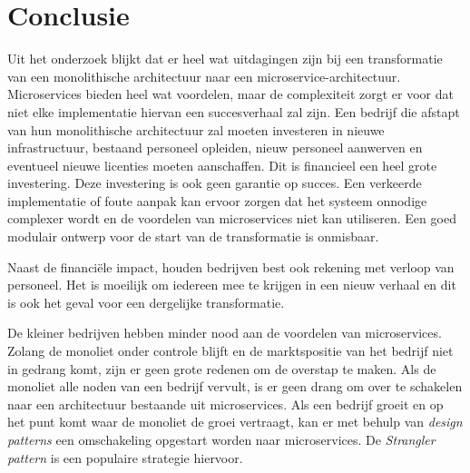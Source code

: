 
\chapter{Conclusie}
\label{ch:conclusie}


Uit het onderzoek blijkt dat er heel wat uitdagingen zijn bij een transformatie van een monolithische architectuur naar een microservice-architectuur. Microservices bieden heel wat voordelen, maar de complexiteit zorgt er voor dat niet elke implementatie hiervan een succesverhaal zal zijn. Een bedrijf die afstapt van hun monolithische architectuur zal moeten investeren in nieuwe infrastructuur, bestaand personeel opleiden, nieuw personeel aanwerven en eventueel nieuwe licenties moeten aanschaffen. Dit is financieel een heel grote investering. Deze investering is ook geen garantie op succes. Een verkeerde implementatie of foute aanpak kan ervoor zorgen dat het systeem onnodige complexer wordt en de voordelen van microservices niet kan utiliseren. Een goed modulair ontwerp voor de start van de transformatie is onmisbaar. 

Naast de financiële impact, houden bedrijven best ook rekening met verloop van personeel. Het is moeilijk om iedereen mee te krijgen in een nieuw verhaal en dit is ook het geval voor een dergelijke transformatie.

De kleiner bedrijven hebben minder nood aan de voordelen van microservices. Zolang de monoliet onder controle blijft en de marktspositie van het bedrijf niet in gedrang komt, zijn er geen grote redenen om de overstap te maken. Als de monoliet alle noden van een bedrijf vervult, is er geen drang om over te schakelen naar een architectuur bestaande uit microservices. Als een bedrijf groeit en op het punt komt waar de monoliet de groei vertraagt, kan er met behulp van \emph{design patterns} een omschakeling opgestart worden naar microservices. De \emph{Strangler pattern} is een populaire strategie hiervoor.

